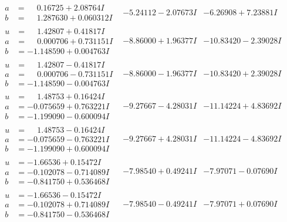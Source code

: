 \documentclass[1p]{elsarticle_modified}
\theoremstyle{definition}
\begin{document}
$$\begin{array}{c|c|c}
\begin{aligned}
a &= \phantom{-}0.16725 + 2.08764 I \\
b &= \phantom{-}1.287630 + 0.060312 I\end{aligned}
 & -5.24112 - 2.07673 I & -6.26908 + 7.23881 I \\ \hline\begin{aligned}
u &= \phantom{-}1.42807 + 0.41817 I \\
a &= \phantom{-}0.000706 + 0.731151 I \\
b &= -1.148590 + 0.004763 I\end{aligned}
 & -8.86000 + 1.96377 I & -10.83420 - 2.39028 I \\ \hline\begin{aligned}
u &= \phantom{-}1.42807 - 0.41817 I \\
a &= \phantom{-}0.000706 - 0.731151 I \\
b &= -1.148590 - 0.004763 I\end{aligned}
 & -8.86000 - 1.96377 I & -10.83420 + 2.39028 I \\ \hline\begin{aligned}
u &= \phantom{-}1.48753 + 0.16424 I \\
a &= -0.075659 + 0.763221 I \\
b &= -1.199090 - 0.600094 I\end{aligned}
 & -9.27667 - 4.28031 I & -11.14224 + 4.83692 I \\ \hline\begin{aligned}
u &= \phantom{-}1.48753 - 0.16424 I \\
a &= -0.075659 - 0.763221 I \\
b &= -1.199090 + 0.600094 I\end{aligned}
 & -9.27667 + 4.28031 I & -11.14224 - 4.83692 I \\ \hline\begin{aligned}
u &= -1.66536 + 0.15472 I \\
a &= -0.102078 - 0.714089 I \\
b &= -0.841750 + 0.536468 I\end{aligned}
 & -7.98540 + 0.49241 I & -7.97071 - 0.07690 I \\ \hline\begin{aligned}
u &= -1.66536 - 0.15472 I \\
a &= -0.102078 + 0.714089 I \\
b &= -0.841750 - 0.536468 I\end{aligned}
 & -7.98540 - 0.49241 I & -7.97071 + 0.07690 I \\ \hline\begin{aligned}

\end{aligned}
\end{array}$$
\end{document}
